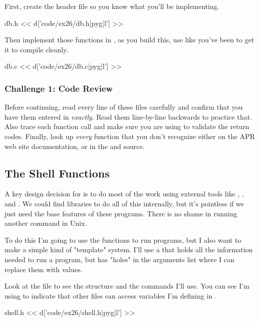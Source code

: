 First, create the  header file so you know what you'll be
implementing.

\begin{code}{db.h}
<< d['code/ex26/db.h|pyg|l'] >>
\end{code}

Then implement those functions in , as you build this, use
 like you've been to get it to compile cleanly.

\begin{code}{db.c}
<< d['code/ex26/db.c|pyg|l'] >>
\end{code}

\subsubsection{Challenge 1: Code Review}

Before continuing, read every line of these files carefully and 
confirm that you have them entered in \emph{exactly}.  Read them
line-by-line backwards to practice that. Also trace each function 
call and make sure you are using  to validate the
return codes.  Finally, look up \emph{every} function that you
don't recognize either on the APR web site documentation, or
in the  and  source.


\subsection{The Shell Functions}

A key design decision for  is to do most of the work
using external tools like , , and .
We could find libraries to do all of this internally, but it's pointless
if we just need the base features of these programs.  There is no shame
in running another command in Unix.

To do this I'm going to use the  functions
to run programs, but I also want to make a simple kind of "template"
system.  I'll use a  that holds all the information
needed to run a program, but has "holes" in the arguments list where I
can replace them with values.

Look at the  file to see the structure and the commands I'll use.
You can see I'm using  to indicate that other  files
can access variables I'm defining in .

\begin{code}{shell.h}
<< d['code/ex26/shell.h|pyg|l'] >>
\end{code}

